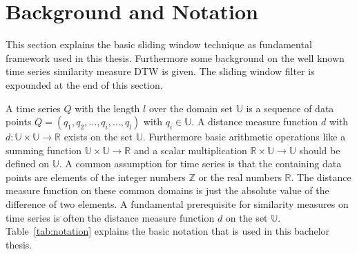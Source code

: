 \section{Background and Notation} \label{background_and_notation}
This section explains the basic sliding window technique as fundamental framework used in this thesis. Furthermore some
background on the well known time series similarity measure DTW is given. The sliding window filter is expounded at the
end of this section.

A time series $Q$ with the length $l$ over the domain set $\mathbb{U}$ is a sequence of data points
$Q = (q_1, q_2, \dots, q_i, \dots, q_l)$ with $q_i \in \mathbb{U}$. A distance measure function $d$ with
$d: \mathbb{U} \times \mathbb{U} \to \mathbb{R}$ exists on the set $\mathbb{U}$. Furthermore basic arithmetic operations
like a summing function $\mathbb{U} \times \mathbb{U} \to \mathbb{R}$ and a scalar multiplication
$\mathbb{R} \times \mathbb{U} \to \mathbb{U}$ should be defined on $\mathbb{U}$. A common assumption for time series is
that the containing data points are elements of the integer numbers $\mathbb{Z}$ or the real numbers $\mathbb{R}$. The
distance measure function on these common domains is just the absolute value of the difference of two elements. A
fundamental prerequisite for similarity measures on time series is often the distance measure function $d$ on the set
$\mathbb{U}$. Table~\ref{tab:notation} explains the basic notation that is used in this bachelor thesis.

